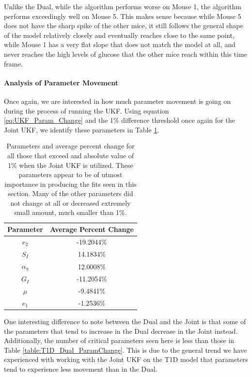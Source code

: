 Unlike the Dual, while the algorithm performs worse on Mouse 1, the algorithm performs exceedingly well on Mouse 5. This makes sense because while Mouse 5 does not have the sharp spike of the other mice, it still follows the general shape of the model relatively closely  and eventually reaches close to the same point, while Mouse 1 has a very flat slope that does not match the model at all, and never reaches the high levels of glucose that the other mice reach within this time frame. 

\paragraph{Analysis of Parameter Movement}

Once again, we are interested in how much parameter movement is going on during the process of running the UKF.
Using equation \ref{eq:UKF_Param_Change} and the 1\% difference threshold once again for the Joint UKF, we identify these parameters in Table \ref{table:T1D_Joint_ParamChange}.


\begin{table}[H]
  \begin{center}
  
    \begin{tabular}{c|c} %
      \textbf{Parameter} & \textbf{Average Percent Change} \\
      \hline
      \textbf{$e_2$} & -19.2044\%\\
      \textbf{$S_I$} & 14.1834\%\\
      \textbf{$\alpha_{\eta}$} & 12.0008\%\\
      \textbf{$G_I$} & -11.2054\%\\
      \textbf{$\mu$} & -9.4841\%\\
      \textbf{$e_1$} & -1.2536\%
    \end{tabular}
    \caption{Parameters and average percent change for all those that exceed and absolute value of 1\% when the Joint UKF is utilized. These parameters appear to be of utmost importance in producing the fits seen in this section. Many of the other parameters did not change at all or decreased extremely small amount, much smaller than 1\%.}
    \label{table:T1D_Joint_ParamChange}
  \end{center}
\end{table}

One interesting difference to note between the Dual and the Joint is that some of the parameters that tend to increase in the Dual decrease in the Joint instead. Additionally, the number of critical parameters seen here is less than those in Table \ref{table:T1D_Dual_ParamChange}. This is due to the general trend we have experienced with working with the Joint UKF on the T1D model that parameters tend to experience less movement than in the Dual.

